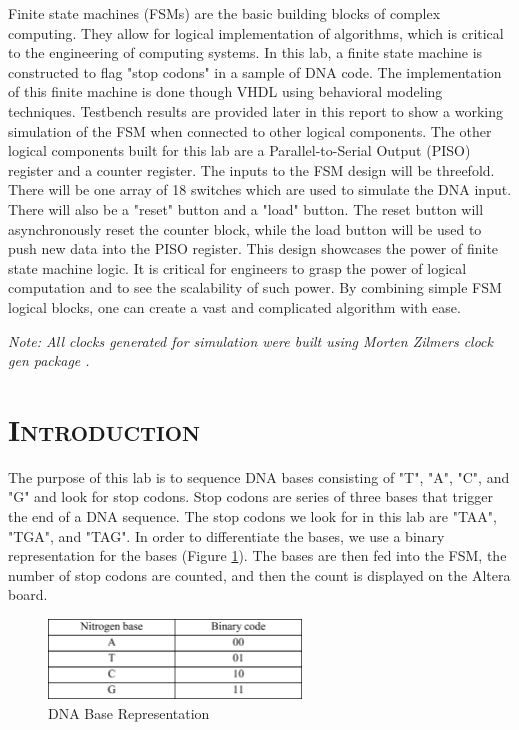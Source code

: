 \documentclass[11pt]{report}
\begin{document}
\begin{spacing}{1.5}
Finite state machines (FSMs) are the basic building blocks of complex computing.  They allow for logical implementation of algorithms, which is critical to the engineering of computing systems.  In this lab, a finite state machine is constructed to flag "stop codons" in a sample of DNA code.  The implementation of this finite machine is done though VHDL using behavioral modeling techniques.  Testbench results are provided later in this report to show a working simulation of the FSM when connected to other logical components.  The other logical components built for this lab are a Parallel-to-Serial Output (PISO) register and a counter register.  The inputs to the FSM design will be threefold.  There will be one array of 18 switches which are used to simulate the DNA input.  There will also be a "reset" button and a "load" button.  The reset button will asynchronously reset the counter block, while the load button will be used to push new data into the PISO register. This design showcases the power of finite state machine logic.  It is critical for engineers to grasp the power of logical computation and to see the scalability of such power.  By combining simple FSM logical blocks, one can create a vast and complicated algorithm with ease.

\vspace{3.5in}

\textit{Note: All clocks generated for simulation were built using Morten Zilmers clock gen package \cite{Synth}.}

\thispagestyle{empty} %
\clearpage
\setcounter{page}{1}

\section*{\scshape Introduction} %
\label{cha:introduction}

The purpose of this lab is to sequence DNA bases consisting of "T", "A", "C", and "G" and look for stop codons.  Stop codons are series of three bases that trigger the end of a DNA sequence.  The stop codons we look for in this lab are "TAA", "TGA", and "TAG".  In order to differentiate the bases, we use a binary representation for the bases (Figure \ref{fig:bases}).  The bases are then fed into the FSM, the number of stop codons are counted, and then the count is displayed on the Altera board.

\vspace{15px}
\begin{figure}[H]
    \centering
    \includegraphics[width=0.6\textwidth,keepaspectratio]{bases.png}
    \caption{DNA Base Representation}
    \label{fig:bases}
\end{figure}


\end{spacing}
\end{document}
